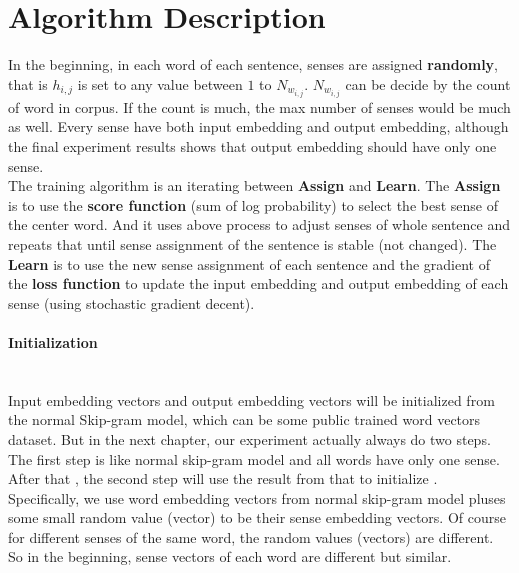 \section{Algorithm Description}

In the beginning, in each word of each sentence, senses are assigned \textbf{randomly}, that is $h_{i,j}$ is set to any value between $1$ to $N_{w_{i,j}}$. $N_{w_{i,j}}$ can be decide by the count of word in corpus. If the count is much, the max number of senses would be much as well. Every sense have both input embedding and output embedding, although the final experiment results shows that output embedding should have only one sense.\\

The training algorithm is an iterating between \textbf{Assign} and \textbf{Learn}. The \textbf{Assign} is to use the \textbf{score function} (sum of log probability) to select the best sense of the center word. And it uses above process to adjust senses of whole sentence and repeats that until sense assignment of the sentence is stable (not changed). The \textbf{Learn} is to use the new sense assignment of each sentence and the gradient of the \textbf{loss function} to update the input embedding and output embedding of each sense (using stochastic gradient decent). 

\paragraph{Initialization}\ \\
Input embedding vectors and output embedding vectors will be initialized from the normal Skip-gram model, which can be some public trained word vectors dataset. But in the next chapter, our experiment actually always do two steps. The first step is like normal skip-gram model and all words have only one sense. After that , the second step will use the result from that to initialize . Specifically, we use word embedding vectors from normal skip-gram model pluses some small random value (vector) to be their sense embedding vectors. Of course for different senses of the same word, the random values (vectors) are different. So in the beginning, sense vectors of each word are different but similar.


